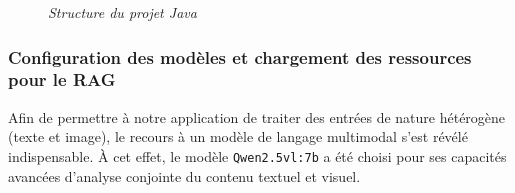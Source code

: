 \documentclass[12pt,a4paper]{report}
\begin{document}
	\begin{figure}[H]
		\centering
		\caption{\textit{Structure du projet Java}}
		\label{fig:structure-projet}
	\end{figure}
	
	\subsubsection{Configuration des modèles et chargement des ressources pour le RAG}
	
	Afin de permettre à notre application de traiter des entrées de nature hétérogène (texte et image), le recours à un modèle de langage multimodal s’est révélé indispensable. À cet effet, le modèle \verb|Qwen2.5vl:7b| a été choisi pour ses capacités avancées d’analyse conjointe du contenu textuel et visuel.
	
\end{document}
